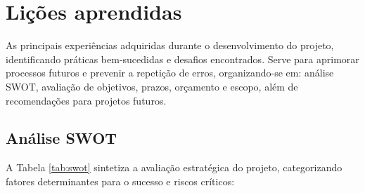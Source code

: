 \chapter{Lições aprendidas}


As principais experiências adquiridas durante o desenvolvimento do projeto, identificando práticas bem-sucedidas e desafios encontrados. Serve para aprimorar processos futuros e prevenir a repetição de erros, organizando-se em: análise SWOT, avaliação de objetivos, prazos, orçamento e escopo, além de recomendações para projetos futuros.

\section{Análise SWOT}


A Tabela \ref{tab:swot} sintetiza a avaliação estratégica do projeto, categorizando fatores determinantes para o sucesso e riscos críticos:

